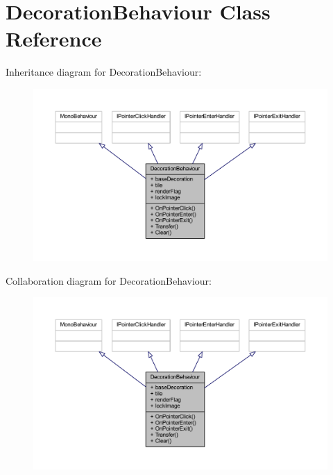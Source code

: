 \hypertarget{class_decoration_behaviour}{}\section{Decoration\+Behaviour Class Reference}
\label{class_decoration_behaviour}


Inheritance diagram for Decoration\+Behaviour\+:\nopagebreak
\begin{figure}[H]
\begin{center}
\leavevmode
\includegraphics[width=350pt]{class_decoration_behaviour__inherit__graph}
\end{center}
\end{figure}


Collaboration diagram for Decoration\+Behaviour\+:\nopagebreak
\begin{figure}[H]
\begin{center}
\leavevmode
\includegraphics[width=350pt]{class_decoration_behaviour__coll__graph}
\end{center}
\end{figure}
